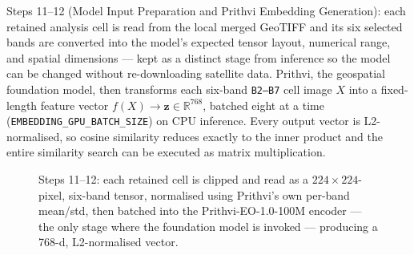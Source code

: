 \documentclass[12pt,a4paper,oneside]{report}
\newcommand{\code}[1]{\texttt{#1}}
\begin{document}
\label{sec:step12_prithvi}

Steps 11--12 (Model Input Preparation and Prithvi Embedding
Generation): each retained analysis cell is read from the local
merged GeoTIFF and
its six selected bands are converted into the model's expected
tensor layout, numerical range, and spatial dimensions --- kept as a
distinct stage from inference so the model can be changed without
re-downloading satellite data. Prithvi, the geospatial foundation
model, then transforms each six-band \code{B2--B7} cell image $X$
into a fixed-length feature vector $f(X) \rightarrow \mathbf{z} \in
\mathbb{R}^{768}$, batched eight at a time
(\code{EMBEDDING\_GPU\_BATCH\_SIZE}) on CPU inference. Every output
vector is L2-normalised, so cosine similarity reduces exactly to the
inner product and the entire similarity search can be executed as
matrix multiplication.

\begin{figure}[H]
\centering
{}
\caption{Steps 11--12: each retained cell is clipped and read as a
$224\times224$-pixel, six-band tensor, normalised using Prithvi's
own per-band mean/std, then batched into the
Prithvi-EO-1.0-100M encoder --- the only stage where the foundation
model is invoked --- producing a 768-d, L2-normalised vector.}
\label{fig:step12_prithvi}
\end{figure}
\end{document}
